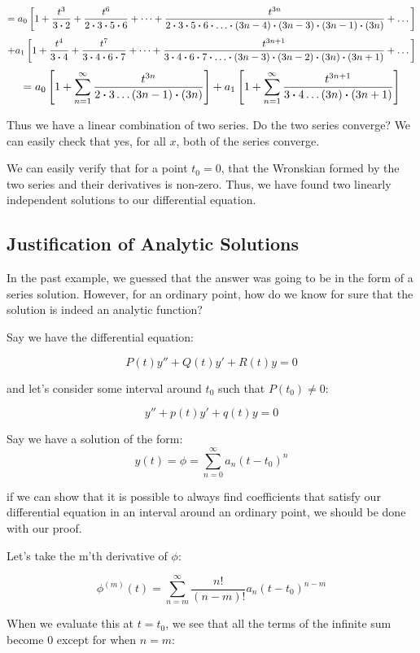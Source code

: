 \documentclass{report}
\begin{document}
$$
= a_0\left[ 1 + \frac{t^3}{3\vdot 2} + \frac{t^6}{2\vdot3\vdot 5 \vdot 6}  + \dots + \frac{t^{3n}}{2 \vdot 3 \vdot 5 \vdot 6 \vdot \dots \vdot (3n-4) \vdot (3n-3) \vdot (3n-1) \vdot (3n)} + \dots \right]
$$
$$
+ a_1\left[ 1 + \frac{t^4}{3\vdot 4} + \frac{t^7}{3\vdot4\vdot 6 \vdot 7}  + \dots + \frac{t^{3n+1}}{3 \vdot 4 \vdot 6 \vdot 7 \vdot \dots \vdot (3n-3) \vdot (3n-2) \vdot (3n) \vdot (3n+1)} + \dots \right]
$$
$$
= 
a_0\left[ 1 + \sum_{n=1}^{\infty} \frac{t^{3n}}{2\vdot3\dots(3n-1)\vdot(3n)}\right]
+ a_1\left[ 1 + \sum_{n=1}^{\infty} \frac{t^{3n+1}}{3\vdot4\dots(3n)\vdot(3n+1)}\right]
$$

Thus we have a linear combination of two series. Do the two series converge? We can easily check that yes, for all $x$, both of the series converge. 

We can easily verify that for a point $t_0 = 0$, that the Wronskian formed by the two series and their derivatives is non-zero. Thus, we have found two linearly independent solutions to our differential equation.





\subsection{Justification of Analytic Solutions}
In the past example, we guessed that the answer was going to be in the form of a series solution. However, for an ordinary point, how do we know for sure that the solution is indeed an analytic function?


Say we have the differential equation:


$$P(t)y'' + Q(t)y' + R(t)y = 0$$

and let's consider some interval around $t_0$ such that $P(t_0) \neq 0$:

$$y'' + p(t)y' + q(t)y = 0$$

Say we have a solution of the form:
$$y(t) = \phi = \sum_{n=0}^{\infty}a_n(t-t_0)^n$$

if we can show that it is possible to always find coefficients that satisfy our differential equation in an interval around an ordinary point, we should be done with our proof.

Let's take the m'th derivative of $\phi$:

$$\phi^{(m)}(t) = \sum_{n=m}^{\infty}\frac{n!}{(n-m)!}a_n(t-t_0)^{n-m}$$

When we evaluate this at $t = t_0$, we see that all the terms of the infinite sum become 0 except for when $n=m$:
\end{document}
